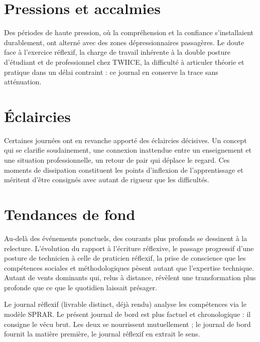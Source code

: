 \section{Pressions et accalmies}

Des périodes de haute pression, où la compréhension et la confiance s'installaient durablement, ont alterné avec des zones dépressionnaires passagères. Le doute face à l'exercice réflexif, la charge de travail inhérente à la double posture d'étudiant et de professionnel chez TWIICE, la difficulté à articuler théorie et pratique dans un délai contraint : ce journal en conserve la trace sans atténuation.

\section{Éclaircies}

Certaines journées ont en revanche apporté des éclaircies décisives. Un concept qui se clarifie soudainement, une connexion inattendue entre un enseignement et une situation professionnelle, un retour de pair qui déplace le regard. Ces moments de dissipation constituent les points d'inflexion de l'apprentissage et méritent d'être consignés avec autant de rigueur que les difficultés.

\section{Tendances de fond}

Au-delà des événements ponctuels, des courants plus profonds se dessinent à la relecture. L'évolution du rapport à l'écriture réflexive, le passage progressif d'une posture de technicien à celle de praticien réflexif, la prise de conscience que les compétences sociales et méthodologiques pèsent autant que l'expertise technique. Autant de vents dominants qui, relus à distance, révèlent une transformation plus profonde que ce que le quotidien laissait présager.

\medskip

\begin{tcolorbox}[
  colback=blue!5, colframe=blue!40!black,
  title={Distinction avec le journal réflexif},
  fonttitle=\bfseries\small, boxrule=0.6pt, arc=3pt,
  left=8pt, right=8pt, top=6pt, bottom=6pt
]
Le journal réflexif (livrable distinct, déjà rendu) analyse les compétences via le modèle SPRAR. Le présent journal de bord est plus factuel et chronologique : il consigne le vécu brut. Les deux se nourrissent mutuellement ; le journal de bord fournit la matière première, le journal réflexif en extrait le sens.
\end{tcolorbox}

